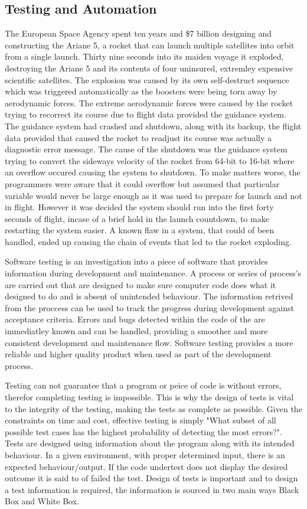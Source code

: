 \documentclass{article}
\begin{document}
\subsection{Testing and Automation}
\par The European Space Agency spent ten years and \$7 billion designing and constructing the Ariane 5, a rocket that can launch multiple satellites into orbit from a single launch. Thirty nine seconds into its maiden voyage it exploded, destroying the Ariane 5 and its contents of four uninsured, extremley expensive scientific satellites. The explosion was caused by its own self-destruct sequence which was triggered automatically as the boosters were being torn away by aerodynamic forces. The extreme aerodynamic forces were caused by the rocket trying to recorrect its course due to flight data provided the guidance system. The guidance system had crashed and shutdown, along with its backup, the flight data provided that caused the rocket to readjust its course was actually a diagnostic error message. The cause of the shutdown was the guidance system trying to convert the sideways velocity of the rocket from 64-bit to 16-bit where an overflow occured causing the system to shutdown. To make matters worse, the programmers were aware that it could overflow but assumed that particular variable would never be large enough as it was used to prepare for launch and not in flight. However it was decided the system should run into the first forty seconds of flight, incase of a brief hold in the launch countdown, to make restarting the system easier. A known flaw in a system, that could of been handled, ended up causing the chain of events that led to the rocket exploding.\cite{Ariane5}
\par Software testing is an investigation into a piece of software that provides information during development and maintenance. A process or series of process's are carried out that are designed to make sure computer code does what it designed to do and is absent of unintended behaviour. \cite{myers2011art}The information retrived from the proccess can be used to track the progress during development against acceptance criteria. Errors and bugs detected within the code of the are immediatley known and can be handled, providing a smoother and more consistent development and maintenance flow. Software testing provides a more reliable and higher quality product when used as part of the development process.
\par Testing can not guarantee that a program or peice of code is without errors, therefor completing testing is impossible. This is why the design of tests is vital to the integrity of the testing, making the tests as complete as possible. Given the constraints on time and cost, effective testing is simply "What subset of all possible test cases has the highest probability of detecting the most errors?"\cite{myers2011art}. Tests are designed using information about the program along with its intended behaviour. In a given environment, with proper determined input, there is an expected behaviour/output. If the code undertest does not display the desired outcome it is said to of failed the test. Design of tests is important and to design a test information is required, the information is sourced in two main ways Black Box and White Box.
\end{document}
